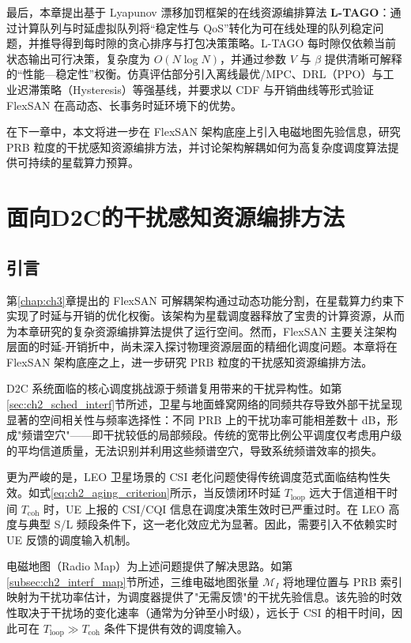 \documentclass[type=master]{fduthesis}
\begin{document}
最后，本章提出基于 Lyapunov 漂移加罚框架的在线资源编排算法 \textbf{L-TAGO}：通过计算队列与时延虚拟队列将“稳定性与 QoS”转化为可在线处理的队列稳定问题，并推导得到每时隙的贪心排序与打包决策策略。L-TAGO 每时隙仅依赖当前状态输出可行决策，复杂度为 $O(N\log N)$，并通过参数 $V$ 与 $\beta$ 提供清晰可解释的“性能—稳定性”权衡。仿真评估部分引入离线最优/MPC、DRL（PPO）与工业迟滞策略（Hysteresis）等强基线，并要求以 CDF 与开销曲线等形式验证 FlexSAN 在高动态、长事务时延环境下的优势。

在下一章中，本文将进一步在 FlexSAN 架构底座上引入电磁地图先验信息，研究 PRB 粒度的干扰感知资源编排方法，并讨论架构解耦如何为高复杂度调度算法提供可持续的星载算力预算。


\chapter{面向D2C的干扰感知资源编排方法}
\label{chap:ch4}

\section{引言}
\label{sec:ch4_intro}

第\ref{chap:ch3}章提出的 FlexSAN 可解耦架构通过动态功能分割，在星载算力约束下实现了时延与开销的优化权衡。该架构为星载调度器释放了宝贵的计算资源，从而为本章研究的复杂资源编排算法提供了运行空间。然而，FlexSAN 主要关注架构层面的时延-开销折中，尚未深入探讨物理资源层面的精细化调度问题。本章将在 FlexSAN 架构底座之上，进一步研究 PRB 粒度的干扰感知资源编排方法。

D2C 系统面临的核心调度挑战源于频谱复用带来的干扰异构性。如第\ref{sec:ch2_sched_interf}节所述，卫星与地面蜂窝网络的同频共存导致外部干扰呈现显著的空间相关性与频率选择性：不同 PRB 上的干扰功率可能相差数十 dB，形成"频谱空穴"——即干扰较低的局部频段。传统的宽带比例公平调度仅考虑用户级的平均信道质量，无法识别并利用这些频谱空穴，导致系统频谱效率的损失。

更为严峻的是，LEO 卫星场景的 CSI 老化问题使得传统调度范式面临结构性失效。如式\eqref{eq:ch2_aging_criterion}所示，当反馈闭环时延 $T_{\mathrm{loop}}$ 远大于信道相干时间 $T_{\mathrm{coh}}$ 时，UE 上报的 CSI/CQI 信息在调度决策生效时已严重过时。在 LEO 高度与典型 S/L 频段条件下，这一老化效应尤为显著。因此，需要引入不依赖实时 UE 反馈的调度输入机制。

电磁地图（Radio Map）为上述问题提供了解决思路。如第\ref{subsec:ch2_interf_map}节所述，三维电磁地图张量 $\mathcal{M}_I$ 将地理位置与 PRB 索引映射为干扰功率估计，为调度器提供了"无需反馈"的干扰先验信息。该先验的时效性取决于干扰场的变化速率（通常为分钟至小时级），远长于 CSI 的相干时间，因此可在 $T_{\mathrm{loop}} \gg T_{\mathrm{coh}}$ 条件下提供有效的调度输入。
\end{document}
